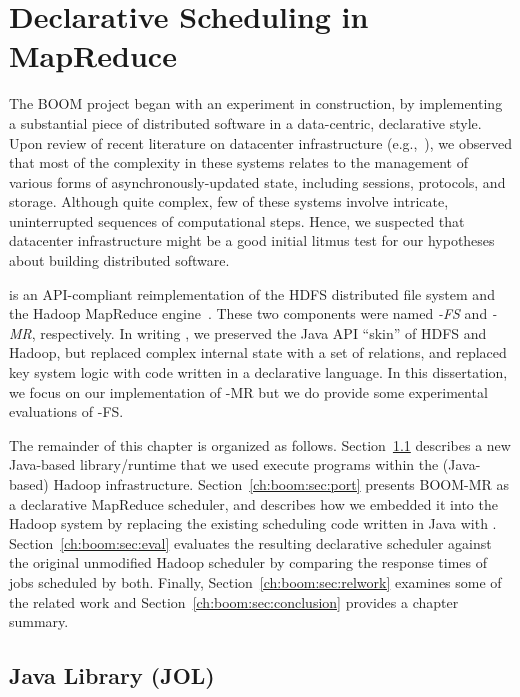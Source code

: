 \chapter[Declarative Scheduling in MapReduce]{Declarative Scheduling in MapReduce}
\label{ch:boom}

The BOOM project began with an experiment in construction, by implementing a substantial piece of
distributed software in a data-centric, declarative style. Upon review of recent literature on
datacenter infrastructure (e.g.,~\cite{chubby,gfs-sosp,dynamo,mapreduce-osdi}),
we observed that most of the complexity in these systems relates to the
management of various forms of asynchronously-updated state, including sessions,
protocols, and storage. Although quite complex, few of these systems involve intricate, uninterrupted
sequences of computational steps. Hence, we suspected that datacenter
infrastructure might be a good initial litmus test for our hypotheses about building distributed software.

\emph{\BOOMA} is an API-compliant reimplementation of the HDFS distributed file system and the Hadoop 
MapReduce engine~\cite{boom}. These two components were named \emph{\BOOM-FS} and \emph{\BOOM-MR}, 
respectively. In writing \BOOMA, we preserved the Java API ``skin'' of HDFS and Hadoop, but replaced complex 
internal state with a set of relations, and replaced key system logic with code written in a declarative language. 
In this dissertation, we focus on our implementation of \BOOM-MR but we do provide some experimental 
evaluations of \BOOM-FS. 

The remainder of this chapter is organized as follows. Section~\ref{ch:boom:sec:jol} describes a new Java-based 
\OVERLOG library/runtime that we used execute \OVERLOG programs within the (Java-based) Hadoop infrastructure. 
Section~\ref{ch:boom:sec:port} presents BOOM-MR as a declarative MapReduce scheduler, and describes 
how we embedded it into the Hadoop system by replacing the existing scheduling code written in Java with \OVERLOG.
Section~\ref{ch:boom:sec:eval} evaluates the resulting declarative scheduler against the original unmodified 
Hadoop scheduler by comparing the response times of jobs scheduled by both. Finally, Section~\ref{ch:boom:sec:relwork} 
examines some of the related work and Section~\ref{ch:boom:sec:conclusion} provides a chapter summary.

\section{Java \OVERLOG Library (JOL)}
\label{ch:boom:sec:jol}

